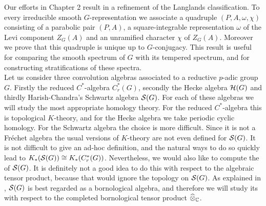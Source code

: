 Our efforts in Chapter 2 result in a refinement of the Langlands classification. To every 
irreducible smooth $G$-representation we associate a quadruple $(P,A,\omega, \chi )$
consisting of a parabolic pair $(P,A)$, a square-integrable representation $\omega$
of the Levi component $Z_G (A)$ and an unramified character $\chi$ of $Z_G (A)$.
Moreover we prove that this quadruple is unique up to $G$-conjugacy. This result is 
useful for comparing the smooth spectrum of $G$ with its
tempered spectrum, and for constructing stratifications of these spectra.
\\[1mm]

Let us consider three convolution algebras associated to a reductive $p$-adic group $G$.
Firstly the reduced $C^*$-algebra $C_r^* (G)$, secondly the Hecke algebra $\mathcal H (G)$
and thirdly Harish-Chandra's Schwartz algebra $\mathcal S (G)$. For each of these algebras 
we will study the most appropriate homology theory. For the reduced $C^*$-algebra this 
is topological $K$-theory, and for the Hecke algebra we take periodic cyclic homology. 
For the Schwartz algebra the choice is more difficult. Since it is not a Fr\'echet algebra 
the usual versions of $K$-theory are not even defined for $\mathcal S (G)$. It is not difficult 
to give an ad-hoc definition, and the natural ways to do so quickly lead to
$K_* (\mathcal S (G)) \cong K_* (C_r^* (G))$. Nevertheless, we would also like to compute
the \pch of $\mathcal S (G)$. It is definitely not a good idea to do this with respect to the 
algebraic tensor product, because that would ignore the topology on $\mathcal S (G)$. As
explained in \cite{Mey}, $\mathcal S (G)$ is best regarded as a bornological algebra, and
therefore we will study its \pch with respect to the completed bornological tensor product
$\widehat{\otimes}_{\mathbb C}$. 


